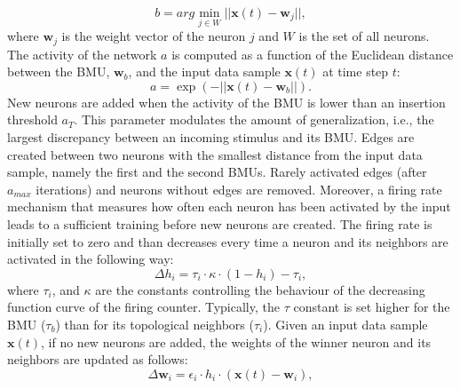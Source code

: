 \documentclass[5p,times]{elsarticle}
\begin{document}
\begin{equation}\label{eq:bmu}
b = arg \min\limits_{j \in W} ||\textbf{x}(t) - \textbf{w}_j||,
\end{equation}
where $\textbf{w}_j$ is the weight vector of the neuron $j$ and $W$ is the set of all neurons.
The activity of the network $a$ is computed as a function of the Euclidean distance between the BMU, $\textbf{w}_b$, and the input data sample $\textbf{x}(t)$ at time step $t$:
\begin{equation}\label{eq:activation}
a = \exp ( { - ||\textbf{x}(t) - \textbf{w}_b|| } ).
\end{equation}
\noindent New neurons are added when the activity of the BMU is lower than an insertion threshold $a_T$.
This parameter modulates the amount of generalization, i.e., the largest discrepancy between an incoming stimulus and its BMU.
Edges are created between two neurons with the smallest distance from the input data sample, namely the first and the second BMUs.
Rarely activated edges (after $a_{max}$ iterations) and neurons without edges are removed.
Moreover, a firing rate mechanism that measures how often each neuron has been activated by the input leads to a sufficient training before new neurons are created. 
The firing rate is initially set to zero and than decreases every time a neuron and its neighbors are activated in the following way:
\begin{equation}\label{eq:hab}
\Delta h_i = \tau_i \cdot \kappa \cdot (1 - h_i) - \tau_i,
\end{equation}
where $\tau_i$, and $\kappa$ are the constants controlling the behaviour of the decreasing function curve of the firing counter.
Typically, the $\tau$ constant is set higher for the BMU ($\tau_b$) than for its topological neighbors ($\tau_i$).
Given an input data sample $\textbf{x}(t)$, if no new neurons are added, the weights of the winner neuron and its neighbors are updated as follows:
\begin{equation}\label{eq:update}
\Delta\textbf{w}_i = \epsilon_i \cdot h_i \cdot (\textbf{x}(t) - \textbf{w}_i),
\end{equation}
\end{document}
